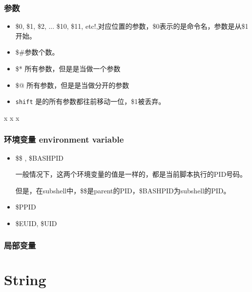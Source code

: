 \subsubsection{参数}

\begin{itemize}
\item \$0, \$1, \$2, ... \${10}, \${11}, etc!,对应位置的参数，\$0表示的是命令名，参数是从\$1开始。
\item \$\#参数个数。
\item \$* 所有参数，但是是当做一个参数
\item \$@ 所有参数，但是是当做分开的参数
\item \lstinline$shift$ 是的所有参数都往前移动一位，\$1被丢弃。
\end{itemize}

\begin{Command-Line}[\$*和\$@的区别]
x
x
x
\end{Command-Line}

\subsubsection{环境变量 environment variable}

\begin{itemize}
\item \$\$ , \$BASHPID

一般情况下，这两个环境变量的值是一样的，都是当前脚本执行的PID号码。


但是，在subshell中，\$\$是parent的PID，\$BASHPID为subshell的PID。



\item \$PPID

\item \$EUID, \$UID


\end{itemize}

\subsubsection{局部变量}

\section{String}

